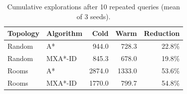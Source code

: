 \begin{table}[t]
\centering
\caption{Cumulative explorations after 10 repeated queries (mean of 3 seeds).}
\label{tab:multi}
\small
\begin{tabular}{llrrr}
\toprule
Topology & Algorithm & Cold & Warm & Reduction \\
\midrule
Random & A* & 944.0 & 728.3 & 22.8\% \\
Random & MXA*-ID & 845.3 & 678.0 & 19.8\% \\
Rooms & A* & 2874.0 & 1333.0 & 53.6\% \\
Rooms & MXA*-ID & 1770.0 & 799.7 & 54.8\% \\
\bottomrule
\end{tabular}
\end{table}
